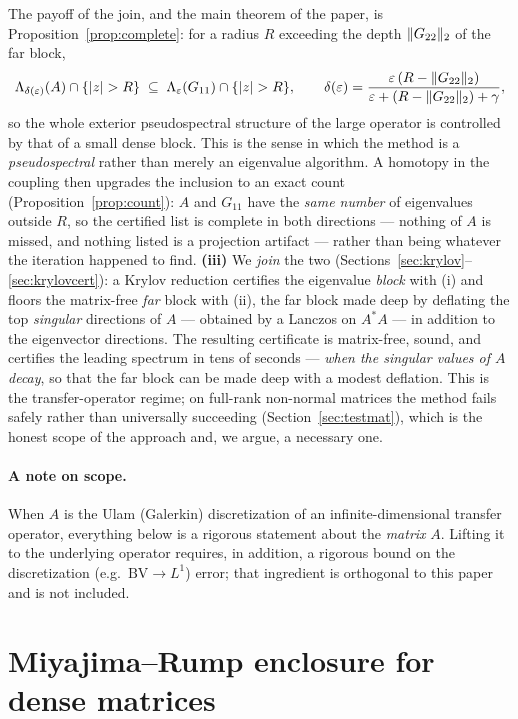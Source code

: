 \documentclass[11pt]{article}
\DeclarePairedDelimiter{\norm}{\lVert}{\rVert}
\DeclarePairedDelimiter{\abs}{\lvert}{\rvert}
\begin{document}
The payoff of the join, and the main theorem of the paper, is Proposition~\ref{prop:complete}: for a
radius $R$ exceeding the depth $\norm{G_{22}}_2$ of the far block,
\[
  \Lambda_{\delta(\varepsilon)}(A)\cap\{\abs{z}>R\}\;\subseteq\;\Lambda_{\varepsilon}(G_{11})\cap\{\abs{z}>R\},
  \qquad
  \delta(\varepsilon)=\frac{\varepsilon\,(R-\norm{G_{22}}_2)}{\varepsilon+(R-\norm{G_{22}}_2)+\gamma},
\]
so the whole exterior pseudospectral structure of the large operator is controlled by that of a small
dense block. This is the sense in which the method is a \emph{pseudospectral} rather than merely an
eigenvalue algorithm. A homotopy in the coupling then upgrades the inclusion to an exact count
(Proposition~\ref{prop:count}): $A$ and $G_{11}$ have the \emph{same number} of eigenvalues outside
$R$, so the certified list is complete in both directions --- nothing of $A$ is missed, and nothing
listed is a projection artifact --- rather than being whatever the iteration happened to find. \textbf{(iii)} We \emph{join} the two
(Sections~\ref{sec:krylov}--\ref{sec:krylovcert}): a Krylov reduction certifies the eigenvalue
\emph{block} with (i) and floors the matrix-free \emph{far} block with (ii), the far block made deep
by deflating the top \emph{singular} directions of $A$ --- obtained by a Lanczos on $A^*A$ --- in
addition to the eigenvector directions. The resulting certificate is matrix-free, sound, and certifies
the leading spectrum in tens of seconds --- \emph{when the singular values of $A$ decay}, so that the
far block can be made deep with a modest deflation. This is the transfer-operator regime; on full-rank
non-normal matrices the method fails safely rather than universally succeeding
(Section~\ref{sec:testmat}), which is the honest scope of the approach and, we argue, a necessary one.

\paragraph{A note on scope.} When $A$ is the Ulam (Galerkin) discretization of an infinite-dimensional
transfer operator, everything below is a rigorous statement about the \emph{matrix} $A$. Lifting it to
the underlying operator requires, in addition, a rigorous bound on the discretization
(e.g.\ $\mathrm{BV}\!\to\!L^1$) error; that ingredient is orthogonal to this paper and is not included.

\section{Miyajima--Rump enclosure for dense matrices}\label{sec:mr}
\end{document}
